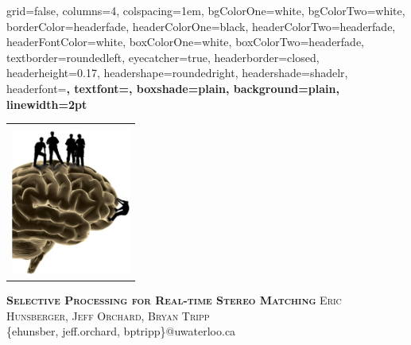 \documentclass[landscape,final,a0paper,fontscale=0.35]{baposter}
\begin{document}



\begin{poster}%
  {
  grid=false,
  columns=4,
  colspacing=1em,
  bgColorOne=white,
  bgColorTwo=white,
  borderColor=headerfade,
  headerColorOne=black,
  headerColorTwo=headerfade,
  headerFontColor=white,
  boxColorOne=white,
  boxColorTwo=headerfade,
  textborder=roundedleft,
  eyecatcher=true,
  headerborder=closed,
  headerheight=0.17\textheight,
  headershape=roundedright,
  headershade=shadelr,
  headerfont=\Large\bf\textsc, %
  textfont={\setlength{\parindent}{1.5em}},
  boxshade=plain,
  background=plain,
  linewidth=2pt
  }
  {
    \begin{tabular}{c}
      \relax\\
      \includegraphics[height=13em]{brain.png}
    \end{tabular}
  }
  {
    \textbf{\textsc{Selective Processing for Real-time Stereo Matching}}\vspace{0.5em}
  }
  {
    \textsc{Eric Hunsberger, Jeff Orchard, Bryan Tripp}\\[0.2em]
    \{ehunsber, jeff.orchard, bptripp\}@uwaterloo.ca\\[0.4em]
}
\end{poster}
\end{document}
